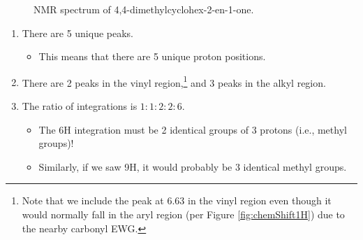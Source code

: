 \documentclass[../notes.tex]{subfiles}
\begin{document}
\begin{itemize}
\begin{figure}[h!]
        \caption{ NMR spectrum of 4,4-dimethylcyclohex-2-en-1-one.}
        \label{fig:NMRdmceo}
    \end{figure}
    \begin{enumerate}
        \item There are 5 unique peaks.
        \begin{itemize}
            \item This means that there are 5 unique proton positions.
        \end{itemize}
        \item There are 2 peaks in the vinyl region,\footnote{Note that we include the peak at \SI{6.63}{\partspermillion} in the vinyl region even though it would normally fall in the aryl region (per Figure \ref{fig:chemShift1H}) due to the nearby carbonyl EWG.} and 3 peaks in the alkyl region.
        \item The ratio of integrations is $1:1:2:2:6$.
        \begin{itemize}
            \item The 6H integration must be 2 identical groups of 3 protons (i.e., methyl groups)!
            \item Similarly, if we saw 9H, it would probably be 3 identical methyl groups.

\end{itemize}
\end{enumerate}
\end{itemize}
\end{document}
